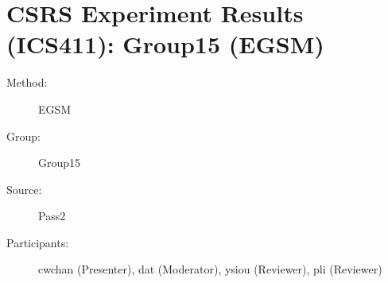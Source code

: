 \chapter {CSRS Experiment Results (ICS411): Group15 (EGSM)}
\small

\begin{description}
\item [Method:] EGSM
\item [Group:] Group15
\item [Source:] Pass2
\item [Participants:] cwchan (Presenter), dat (Moderator), ysiou (Reviewer), pli (Reviewer)
\end{description}
